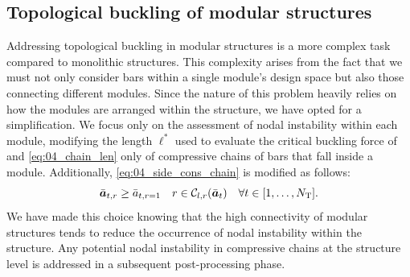 \subsection{Topological buckling of modular structures}
Addressing topological buckling in modular structures is a more complex task compared to monolithic structures. This complexity arises from the fact that we must not only consider bars within a single module's design space but also those connecting different modules. Since the nature of this problem heavily relies on how the modules are arranged within the structure, we have opted for a simplification.  We focus only on the assessment of nodal instability within each module, modifying the length $\ell^*$ used to evaluate the critical buckling force of  and \eqref{eq:04_chain_len} only of compressive chains of bars that fall inside a module. Additionally, \eqref{eq:04_side_cons_chain} is modified as follows:
\begin{equation}\label{eq:05_side_cons_chain_modular}
    \bar{\bm{a}}_{t,r} \geq \bar{a}_{t,r=1} \quad r \in \mathcal{C}_{l,r}(\bar{\bm{a}}_t) \quad \forall t \in [1,\dots,N_\text{T}].
\end{equation}
We have made this choice knowing that the high connectivity of modular structures tends to reduce the occurrence of nodal instability within the structure. Any potential nodal instability in compressive chains at the structure level is addressed in a subsequent post-processing phase.


